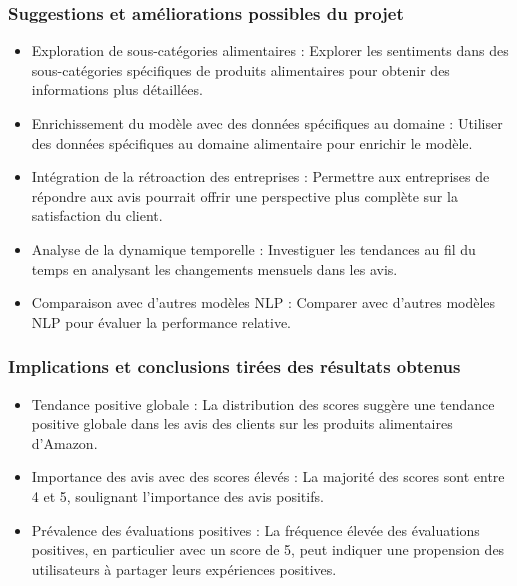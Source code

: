 \begin{frame}
    \frametitle{Suggestions et améliorations possibles du projet}
    \begin{itemize}
        \item Exploration de sous-catégories alimentaires : Explorer les sentiments dans des sous-catégories spécifiques de produits alimentaires pour obtenir des informations plus détaillées.
        \item Enrichissement du modèle avec des données spécifiques au domaine : Utiliser des données spécifiques au domaine alimentaire pour enrichir le modèle.
        \item Intégration de la rétroaction des entreprises : Permettre aux entreprises de répondre aux avis pourrait offrir une perspective plus complète sur la satisfaction du client.
        \item Analyse de la dynamique temporelle : Investiguer les tendances au fil du temps en analysant les changements mensuels dans les avis.
        \item Comparaison avec d'autres modèles NLP : Comparer avec d'autres modèles NLP pour évaluer la performance relative.
    \end{itemize}
\end{frame}

\begin{frame}
    \frametitle{Implications et conclusions tirées des résultats obtenus}
    \begin{itemize}
        \item Tendance positive globale : La distribution des scores suggère une tendance positive globale dans les avis des clients sur les produits alimentaires d'Amazon.
        \item Importance des avis avec des scores élevés : La majorité des scores sont entre 4 et 5, soulignant l'importance des avis positifs.
        \item Prévalence des évaluations positives : La fréquence élevée des évaluations positives, en particulier avec un score de 5, peut indiquer une propension des utilisateurs à partager leurs expériences positives.
    \end{itemize}
\end{frame}
